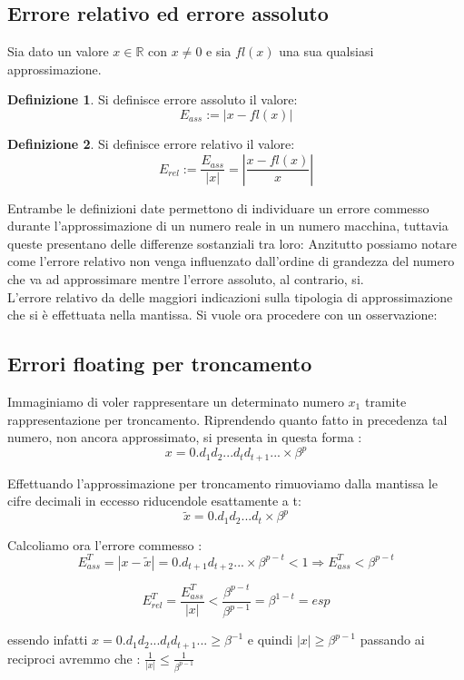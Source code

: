 \documentclass[12pt, a4paper]{book}
\theoremstyle{definition}
\newtheorem{defn}{Definizione}[section]
\begin{document}
\subsection{Errore relativo ed errore assoluto}
\begin{flushleft}
Sia dato un valore $x \in \mathbb{R}$ con $x \neq 0$ e sia $fl(x)$ una sua qualsiasi approssimazione. 
\begin{defn}
Si definisce errore assoluto il valore: \[ E_{ass} := |x - fl(x)| \]
\end{defn}
\begin{defn}
Si definisce errore relativo il valore: \[E_{rel} := \frac{E_{ass}}{|x|} =  \displaystyle\left\lvert \frac{x - fl(x)}{x} \right\rvert\]
\end{defn}
Entrambe le definizioni date permettono di individuare un errore commesso durante l'approssimazione di un numero reale in un numero macchina, tuttavia queste presentano delle differenze sostanziali tra loro: 
Anzitutto possiamo notare come l'errore relativo non venga influenzato dall'ordine di grandezza del numero che va ad approssimare mentre l'errore assoluto, al contrario, si. \\
L'errore relativo da delle maggiori indicazioni sulla tipologia di approssimazione che si è effettuata nella mantissa.  
Si vuole ora procedere con un osservazione:
\end{flushleft}

\subsection{Errori floating per troncamento}
\begin{flushleft}
Immaginiamo di voler rappresentare un determinato numero $x_{1}$  tramite rappresentazione per troncamento. 
Riprendendo quanto fatto in precedenza tal numero, non ancora approssimato,  si presenta in questa forma : 
\[
	 x = 0.d_{1}d_{2}...d_{t}d_{t+1}... \times \beta^{p} 
\]

Effettuando l'approssimazione per troncamento rimuoviamo dalla mantissa le cifre decimali in eccesso riducendole esattamente a t:
\[ 
	\widetilde{x} = 0.d_{1}d_{2}...d_{t}\times\beta^{p} 
\]

Calcoliamo ora l'errore commesso : 
\[ 
	E_{ass}^{T} = |x - \widetilde{x}| =   0.d_{t+1}d_{t+2}...\times\beta^{p-t} < 1 \Longrightarrow  E_{ass}^{T} < \beta^{p-t}  
\]

\[
	E_{rel}^{T} = \frac{E_{ass}^{T}}{|x|} < \frac{ \beta^{p-t}}{ \beta^{p-1}} =  \beta^{1-t} = esp \]

essendo infatti $x = 0.d_{1}d_{2}...d_{t}d_{t+1}... \geq \beta^{-1}$ e quindi $|x| \geq \beta^{p-1}$ passando ai reciproci avremmo che : $\frac{1}{|x|} \leq \frac{1}{\beta^{p-1}}$
\end{flushleft}
\pagebreak
\end{document}
